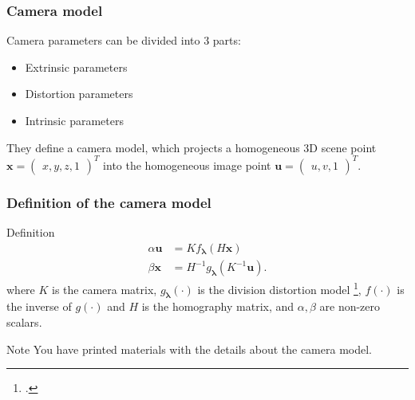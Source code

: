 \documentclass{beamer}
\begin{document}
\begin{frame}
	\frametitle{Camera model}
	Camera parameters can be divided into 3 parts:
	\begin{itemize}
		\item Extrinsic parameters
		\item Distortion parameters
		\item Intrinsic parameters
	\end{itemize}

	They define a camera model, which
	projects a homogeneous 3D scene point
	\(\mathbf{x} = \begin{pmatrix}
		x, y, z, 1
	\end{pmatrix}^{T}\) into the homogeneous image point
	\(\mathbf{u} = \begin{pmatrix}
		u, v, 1
	\end{pmatrix}^{T}\).
\end{frame}

\begin{frame}
	\frametitle{Definition of the camera model}
	\begin{exampleblock}{Definition}
		\begin{align}
			\alpha \mathbf{u} & = K f_{\boldsymbol{\lambda}}(H\mathbf{x})
			\tag{Projection} \label{eq:projection}                                            \\
			\beta \mathbf{x}  & = H^{-1} g_{\boldsymbol{\lambda}}(K^{-1}\mathbf{u}) \tag{Back
				projection} \label{eq:back_projection}.
		\end{align}
		where \(K\) is the camera matrix, \(g_{\boldsymbol{\lambda}}(\cdot)\) is the division distortion
		model \footcite{fitzgibbonSimultaneousLinearEstimation2001}, \(f(\cdot)\) is the
		inverse of \(g(\cdot)\) and \(H\) is the homography matrix, and \(\alpha,
		\beta\) are non-zero scalars.
	\end{exampleblock}

	\begin{alertblock}{Note}
		You have printed materials with the details about the camera model.
	\end{alertblock}

\end{frame}
\end{document}
